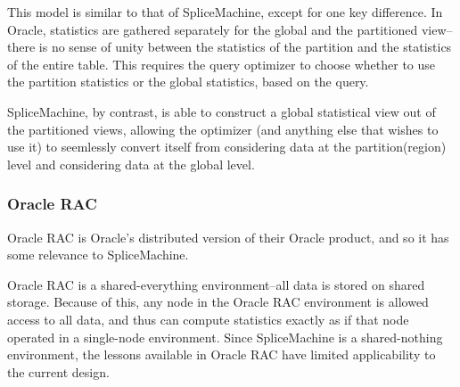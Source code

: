 This model is similar to that of SpliceMachine, except for one key difference. In Oracle, statistics are gathered separately for the global and the partitioned view--there is no sense of unity between the statistics of the partition and the statistics of the entire table. This requires the query optimizer to choose whether to use the partition statistics or the global statistics, based on the query.

SpliceMachine, by contrast, is able to construct a global statistical view out of the partitioned views, allowing the optimizer (and anything else that wishes to use it) to seemlessly convert itself from considering data at the partition(region) level and considering data at the global level.

\subsubsection{Oracle RAC}
Oracle RAC is Oracle's distributed version of their Oracle product, and so it has some relevance to SpliceMachine. 

Oracle RAC is a shared-everything environment\cite{OracleRAC}--all data is stored on shared storage. Because of this, any node in the Oracle RAC environment is allowed access to all data, and thus can compute statistics exactly as if that node operated in a single-node environment. Since SpliceMachine is a shared-nothing environment, the lessons available in Oracle RAC have limited applicability to the current design.

